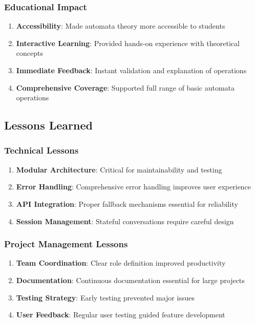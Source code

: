 \documentclass[12pt]{article}
\begin{document}
\subsubsection{Educational Impact}
\begin{enumerate}
    \item \textbf{Accessibility}: Made automata theory more accessible to students
    \item \textbf{Interactive Learning}: Provided hands-on experience with theoretical concepts
    \item \textbf{Immediate Feedback}: Instant validation and explanation of operations
    \item \textbf{Comprehensive Coverage}: Supported full range of basic automata operations
\end{enumerate}

\subsection{Lessons Learned}

\subsubsection{Technical Lessons}
\begin{enumerate}
    \item \textbf{Modular Architecture}: Critical for maintainability and testing
    \item \textbf{Error Handling}: Comprehensive error handling improves user experience
    \item \textbf{API Integration}: Proper fallback mechanisms essential for reliability
    \item \textbf{Session Management}: Stateful conversations require careful design
\end{enumerate}

\subsubsection{Project Management Lessons}
\begin{enumerate}
    \item \textbf{Team Coordination}: Clear role definition improved productivity
    \item \textbf{Documentation}: Continuous documentation essential for large projects
    \item \textbf{Testing Strategy}: Early testing prevented major issues
    \item \textbf{User Feedback}: Regular user testing guided feature development
\end{enumerate}
\end{document}
